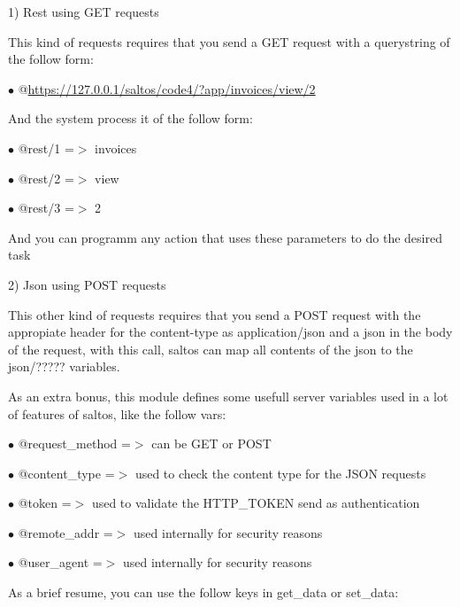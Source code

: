 \documentclass[a4paper]{book}
\def\htmladdnormallink#1#2{\href{#2}{#1}}
\begin{document}
1) Rest using GET requests

This kind of requests requires that you send a GET request with a querystring of the follow
form:

\begin{compactitem}
\item[\color{myblue}$\bullet$] @\htmladdnormallink{https://127.0.0.1/saltos/code4/?app/invoices/view/2}{https://127.0.0.1/saltos/code4/?app/invoices/view/2}
\end{compactitem}

And the system process it of the follow form:

\begin{compactitem}
\item[\color{myblue}$\bullet$] @rest/1 =$>$ invoices
\item[\color{myblue}$\bullet$] @rest/2 =$>$ view
\item[\color{myblue}$\bullet$] @rest/3 =$>$ 2
\end{compactitem}

And you can programm any action that uses these parameters to do the desired task

2) Json using POST requests

This other kind of requests requires that you send a POST request with the appropiate header
for the content-type as application/json and a json in the body of the request, with this
call, saltos can map all contents of the json to the json/????? variables.

As an extra bonus, this module defines some usefull server variables used in a lot of
features of saltos, like the follow vars:

\begin{compactitem}
\item[\color{myblue}$\bullet$] @request\_method =$>$ can be GET or POST
\item[\color{myblue}$\bullet$] @content\_type   =$>$ used to check the content type for the JSON requests
\item[\color{myblue}$\bullet$] @token          =$>$ used to validate the HTTP\_TOKEN send as authentication
\item[\color{myblue}$\bullet$] @remote\_addr    =$>$ used internally for security reasons
\item[\color{myblue}$\bullet$] @user\_agent     =$>$ used internally for security reasons
\end{compactitem}

As a brief resume, you can use the follow keys in get\_data or set\_data:
\end{document}
